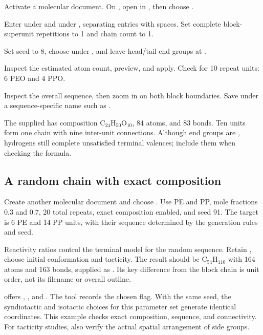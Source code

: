 \begin{steps}
  \item Activate a molecular document. On , open  in , then choose .
  \item Enter  under  and  under , separating entries with spaces. Set complete block-superunit repetitions to 1 and chain count to 1.
  \item Set seed to 8, choose  under , and leave head/tail end groups at .
  \item Inspect the estimated atom count, preview, and apply. Check for 10 repeat units: 6 PEO and 4 PPO.
  \item Inspect the overall sequence, then zoom in on both block boundaries. Save under a sequence-specific name such as .
\end{steps}

The supplied  has composition $\mathrm{C_{24}H_{50}O_{10}}$, 84 atoms, and 83 bonds. Ten units form one chain with nine inter-unit connections. Although end groups are , hydrogens still complete unsatisfied terminal valences; include them when checking the formula.



\subsection{A random chain with exact composition}

Create another molecular document and choose . Use PE and PP, mole fractions 0.3 and 0.7, 20 total repeats, exact composition enabled, and seed 91. The target is 6 PE and 14 PP units, with their sequence determined by the generation rules and seed.

Reactivity ratios control the terminal model for the random sequence. Retain , choose  initial conformation and  tacticity. The result should be $\mathrm{C_{54}H_{110}}$ with 164 atoms and 163 bonds, supplied as . Its key difference from the block chain is unit order, not its filename or overall outline.

 offers , , and . The tool records the chosen flag. With the same seed, the syndiotactic and isotactic choices for this parameter set generate identical coordinates. This example checks exact composition, sequence, and connectivity. For tacticity studies, also verify the actual spatial arrangement of side groups.


